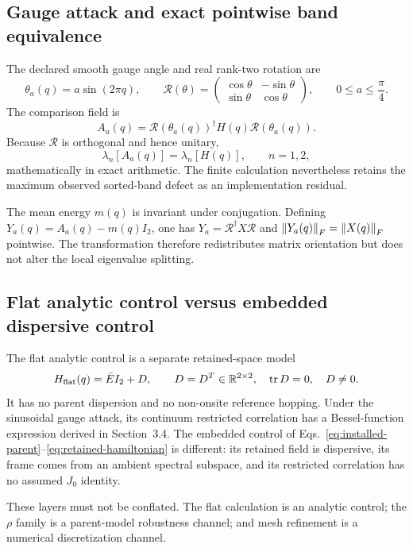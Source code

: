 \subsection{Gauge attack and exact pointwise band equivalence}

The declared smooth gauge angle and real rank-two rotation are
\begin{equation}
 \theta_a(q)=a\sin(2\pi q),
 \qquad
 \mathcal R(\theta)=
 \begin{pmatrix}\cos\theta&-\sin\theta\\
                 \sin\theta& \cos\theta\end{pmatrix},
 \qquad 0\le a\le\frac{\pi}{4}.
 \label{eq:gauge-rotation}
\end{equation}
The comparison field is
\begin{equation}
 A_a(q)=\mathcal R(\theta_a(q))^\dagger
        H(q)\mathcal R(\theta_a(q)).
 \label{eq:comparison-field}
\end{equation}
Because $\mathcal R$ is orthogonal and hence unitary,
\begin{equation}
 \lambda_n[A_a(q)]=\lambda_n[H(q)],\qquad n=1,2,
 \label{eq:exact-band-equivalence}
\end{equation}
mathematically in exact arithmetic.  The finite calculation nevertheless retains the
maximum observed sorted-band defect as an implementation residual.

The mean energy $m(q)$ is invariant under conjugation.  Defining
$Y_a(q)=A_a(q)-m(q)I_2$, one has
$Y_a=\mathcal R^\dagger X\mathcal R$ and
$\left\lVert Y_a(q)\right\rVert_F=\left\lVert X(q)\right\rVert_F$ pointwise.  The transformation therefore redistributes
matrix orientation but does not alter the local eigenvalue splitting.

\subsection{Flat analytic control versus embedded dispersive control}

The flat analytic control is a separate retained-space model
\begin{equation}
 H_{\mathrm{flat}}(q)=\bar E I_2+D,
 \qquad D=D^T\in\mathbb R^{2\times2},
 \quad\operatorname{tr} D=0,
 \quad D\ne0.
 \label{eq:flat-control}
\end{equation}
It has no parent dispersion and no non-onsite reference hopping.  Under the sinusoidal
gauge attack, its continuum restricted correlation has a Bessel-function expression
derived in Section~3.4.  The embedded control of
Eqs.~\eqref{eq:installed-parent}--\eqref{eq:retained-hamiltonian} is different: its
retained field is dispersive, its frame comes from an ambient spectral subspace, and its
restricted correlation has no assumed $J_0$ identity.

These layers must not be conflated.  The flat calculation is an analytic control; the
$\rho$ family is a parent-model robustness channel; and mesh refinement is a numerical
discretization channel.
